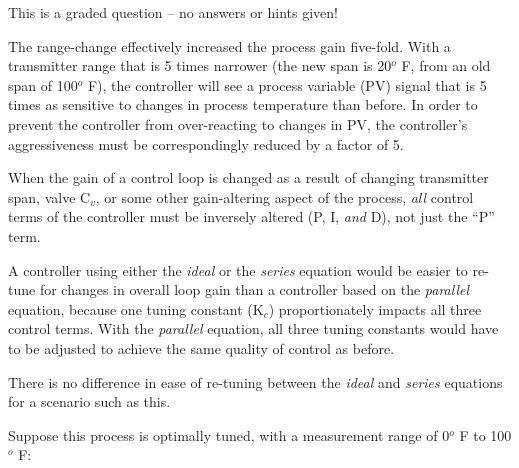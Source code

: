 This is a graded question -- no answers or hints given!







The range-change effectively increased the process gain five-fold.  With a transmitter range that is 5 times narrower (the new span is 20$^{o}$ F, from an old span of 100$^{o}$ F), the controller will see a process variable (PV) signal that is 5 times as sensitive to changes in process temperature than before.  In order to prevent the controller from over-reacting to changes in PV, the controller's aggressiveness must be correspondingly reduced by a factor of 5.

\vskip 10pt

When the gain of a control loop is changed as a result of changing transmitter span, valve C$_{v}$, or some other gain-altering aspect of the process, {\it all} control terms of the controller must be inversely altered (P, I, {\it and} D), not just the ``P'' term.  

A controller using either the {\it ideal} or the {\it series} equation would be easier to re-tune for changes in overall loop gain than a controller based on the {\it parallel} equation, because one tuning constant (K$_{c}$) proportionately impacts all three control terms.  With the {\it parallel} equation, all three tuning constants would have to be adjusted to achieve the same quality of control as before.  

There is no difference in ease of re-tuning between the {\it ideal} and {\it series} equations for a scenario such as this.






Suppose this process is optimally tuned, with a measurement range of 0$^{o}$ F to 100$^{o}$ F:

